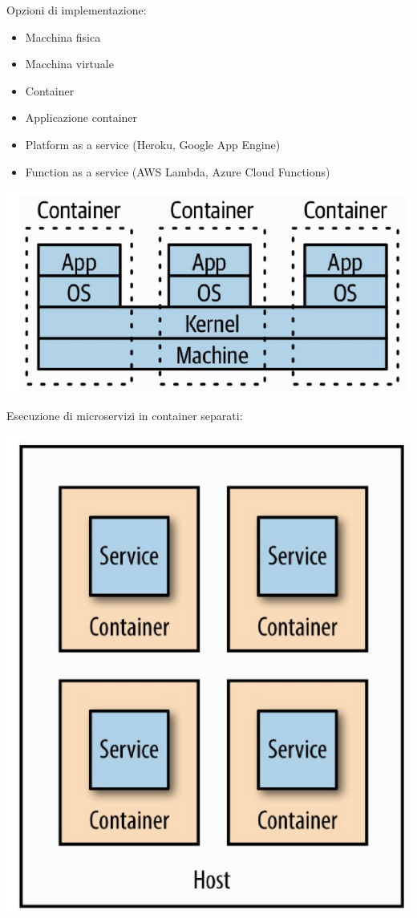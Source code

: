 \begin{multicols}{2}
Opzioni di implementazione:
\begin{itemize}
    \item Macchina fisica
    \item Macchina virtuale
    \item Container
    \item Applicazione container
    \item Platform as a service (Heroku, Google App Engine)
    \item Function as a service (AWS Lambda, Azure Cloud Functions)
\end{itemize}
\begin{center}
    \includegraphics[scale = 0.4]{Images/SOA/Deployment3.jpg}
\end{center}

\end{multicols}

Esecuzione di microservizi in container separati:
\begin{center}
    \includegraphics[scale = 0.4]{Images/SOA/Deployment4.jpg}
\end{center}

